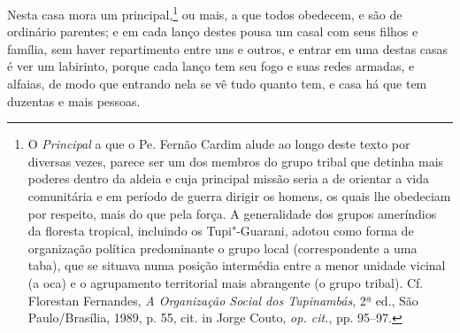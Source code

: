  Nesta casa mora um principal,\footnote{ O \textit{Principal} a que o
Pe. Fernão Cardim alude ao longo deste texto por diversas vezes, parece
ser um dos membros do grupo tribal que detinha mais poderes dentro da
aldeia e cuja principal missão seria a de orientar a vida comunitária e
em período de guerra dirigir os homens, os quais lhe obedeciam por
respeito, mais do que pela força. A generalidade dos grupos ameríndios
da floresta tropical, incluindo os Tupi"-Guarani, adotou como forma de
organização política predominante o grupo local (correspondente a uma
taba), que se situava numa posição intermédia entre a menor unidade
vicinal (a oca) e o agrupamento territorial mais abrangente (o grupo
tribal). Cf. Florestan Fernandes, \textit{A Organização Social dos
Tupinambás}, 2ª ed., São Paulo/Brasília, 1989, p. 55, cit. in Jorge
Couto, \textit{op. cit.}, pp. 95--97.} ou mais, a que todos obedecem, e
são de ordinário parentes; e em cada lanço destes pousa um casal com
seus filhos e família, sem haver repartimento entre uns e outros, e
entrar em uma destas casas é ver um labirinto, porque cada lanço tem
seu fogo e suas redes armadas, e alfaias, de modo que entrando nela se
vê tudo quanto tem, e casa há que tem duzentas e mais pessoas.

